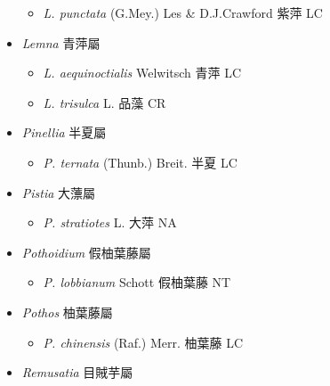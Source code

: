 \begin{itemize}
  \begin{itemize}
        \item[] \textit{L. punctata} (G.Mey.) Les \& D.J.Crawford  紫萍   LC
  \end{itemize}
 \item[] \textit{Lemna} 青萍屬
                                
  \begin{itemize}
        \item[] \textit{L. aequinoctialis} Welwitsch  青萍   LC
        \item[] \textit{L. trisulca} L.  品藻   CR
  \end{itemize}
 \item[] \textit{Pinellia} 半夏屬
                                
  \begin{itemize}
        \item[] \textit{P. ternata} (Thunb.) Breit.  半夏   LC
  \end{itemize}
 \item[] \textit{Pistia} 大薸屬
                                
  \begin{itemize}
        \item[] \textit{P. stratiotes} L.  大萍   NA
  \end{itemize}
 \item[] \textit{Pothoidium} 假柚葉藤屬
                                
  \begin{itemize}
        \item[] \textit{P. lobbianum} Schott  假柚葉藤   NT
  \end{itemize}
 \item[] \textit{Pothos} 柚葉藤屬
                                
  \begin{itemize}
        \item[] \textit{P. chinensis} (Raf.) Merr.  柚葉藤   LC
  \end{itemize}
 \item[] \textit{Remusatia} 目賊芋屬
                                

\end{itemize}
